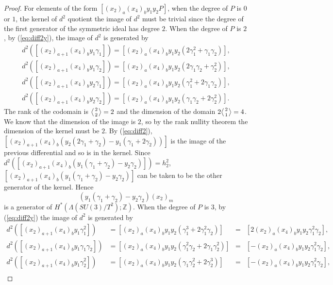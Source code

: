 \documentclass{article}
\theoremstyle{plain}
\theoremstyle{definition}
\numberwithin{thm}{section}
\begin{document}
\begin{proof}
				For elements of the form $[(x_2)_a(x_4)_by_1y_2P]$, when the degree of $P$ is $0$ or $1$, the kernel of $d^2$ quotient the image of $d^2$ must be trivial
				since the degree of the first generator of the symmetric ideal has degree $2$.
				When the degree of $P$ is $2$, by (\ref{eq:diff2y}), the image of $d^2$ is generated by
				\begin{align*}
					d^2([(x_2)_{a+1}(x_4)_by_1\gamma_1])=[(x_2)_{a}(x_4)_by_1y_2(2\gamma_1^2+\gamma_1\gamma_2)], \\ 
					d^2([(x_2)_{a+1}(x_4)_by_1\gamma_2])=[(x_2)_{a}(x_4)_by_1y_2(2\gamma_1\gamma_2+\gamma_2^2)], \\
					d^2([(x_2)_{a+1}(x_4)_by_2\gamma_1])=[(x_2)_{a}(x_4)_by_1y_2(\gamma_1^2+2\gamma_1\gamma_2)], \\
					d^2([(x_2)_{a+1}(x_4)_by_2\gamma_2])=[(x_2)_{a}(x_4)_by_1y_2(\gamma_1\gamma_2+2\gamma_2^2)].
				\end{align*}
				The rank of the codomain is ${\ensuremath{\left \langle \genfrac{}{}{0pt}{}{{2}}{{2}}\right \rangle}}=2$ and the dimension of the domain $2{\ensuremath{\left \langle \genfrac{}{}{0pt}{}{{2}}{{1}}\right \rangle}}=4$.
				We know that the dimension of the image is $2$, so by the rank nullity theorem the dimension of the kernel must be $2$.
				By (\ref{eq:diff2}), $[(x_2)_{a+1}(x_4)_b(y_2(2\gamma_1+\gamma_2)-y_1(\gamma_1+2\gamma_2))]$ is the image of the previous differential and so is in the kernel.
				Since $d^2([(x_2)_{a+1}(x_{4})_b(y_1(\gamma_1+\gamma_2)-y_2\gamma_2)])=h_2^2$, $[(x_2)_{a+1}(x_{4})_b(y_1(\gamma_1+\gamma_2)-y_2\gamma_2)]$
				can be taken to be the other generator of the kernel.
				Hence  
				\begin{equation*}
					(y_1(\gamma_1+\gamma_2)-y_2\gamma_2)(x_2)_m
				\end{equation*}
				is a generator of $H^*(\Lambda(SU(3)/T^2);\mathbb{Z})$.
				When the degree of $P$ is $3$, by (\ref{eq:diff2y}) the image of $d^2$ is generated by
				\begin{align}
					d^2([(x_2)_{a+1}(x_4)_by_1\gamma_1^2])			&=[(x_2)_{a}(x_4)_by_1y_2(\gamma_1^3+2\gamma_1^2\gamma_2)]				&=&[2(x_2)_{a}(x_4)_by_1y_2\gamma_1^2\gamma_2]					,\label{1}\\ 
					d^2([(x_2)_{a+1}(x_4)_by_1\gamma_1\gamma_2])&=[(x_2)_{a}(x_4)_by_1y_2(\gamma_1^2\gamma_2+2\gamma_1\gamma_2^2)]&=&[-(x_2)_{a}(x_4)_by_1y_2\gamma_1^2\gamma_2]					,\label{2}\\
					d^2([(x_2)_{a+1}(x_4)_by_1\gamma_2^2])			&=[(x_2)_{a}(x_4)_by_1y_2(\gamma_1\gamma_2^2+2\gamma_2^3)]				&=&[-(x_2)_{a}(x_4)_by_1y_2\gamma_1^2\gamma_2]					,\label{3}\\

\end{align}
\end{proof}
\end{document}
